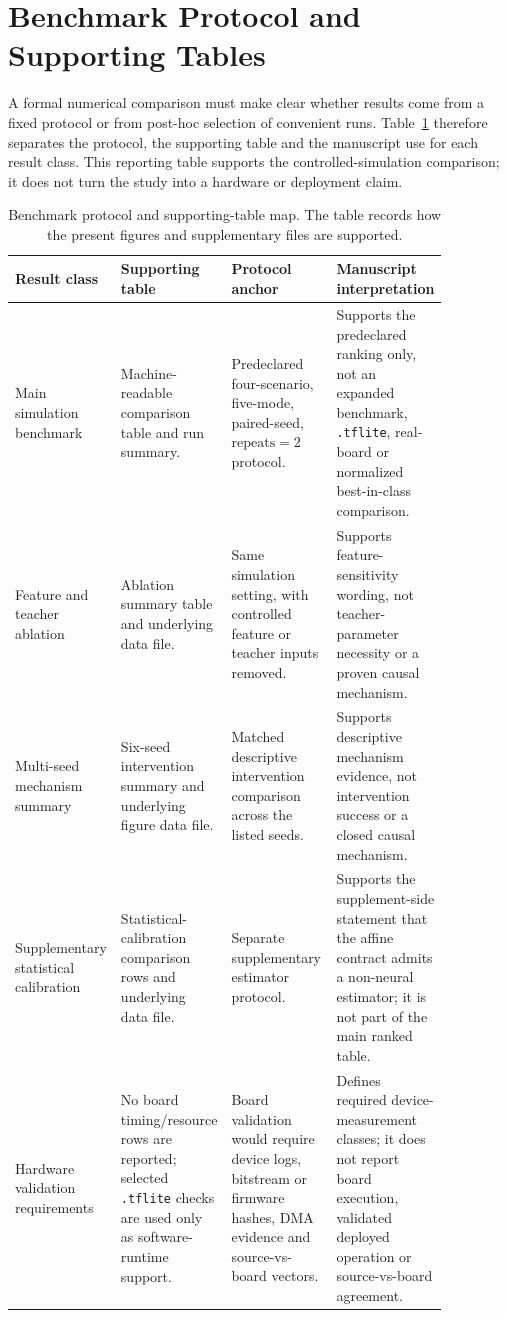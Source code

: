 \documentclass[11pt]{article}
\begin{document}
\section{Benchmark Protocol and Supporting Tables}

A formal numerical comparison must make clear whether results come from a
fixed protocol or from post-hoc selection of convenient runs.
Table~\ref{tab:benchmark-support-map} therefore separates the protocol, the
supporting table and the manuscript use for each result class.  This
reporting table supports the controlled-simulation comparison; it does not turn
the study into a hardware or deployment claim.

\begin{table}[htbp]
\centering
\small
\begin{tabular}{@{}>{\raggedright\arraybackslash}p{0.18\linewidth}>{\raggedright\arraybackslash}p{0.25\linewidth}>{\raggedright\arraybackslash}p{0.25\linewidth}>{\raggedright\arraybackslash}p{0.18\linewidth}@{}}
\toprule
Result class & Supporting table & Protocol anchor & Manuscript interpretation \\
\midrule
Main simulation benchmark &
Machine-readable comparison table and run summary. &
Predeclared four-scenario, five-mode, paired-seed,
\(\mathrm{repeats}=2\) protocol. &
Supports the predeclared ranking only, not an expanded benchmark,
\texttt{.tflite}, real-board or normalized best-in-class comparison. \\
\addlinespace
Feature and teacher ablation &
Ablation summary table and underlying data file. &
Same simulation setting, with controlled feature or teacher inputs removed. &
Supports feature-sensitivity wording, not teacher-parameter necessity or a
proven causal mechanism. \\
\addlinespace
Multi-seed mechanism summary &
Six-seed intervention summary and underlying figure data file. &
Matched descriptive intervention comparison across the listed seeds. &
Supports descriptive mechanism evidence, not intervention success or a closed
causal mechanism. \\
\addlinespace
Supplementary statistical calibration &
Statistical-calibration comparison rows and underlying data file. &
Separate supplementary estimator protocol. &
Supports the supplement-side statement that the affine contract admits a
non-neural estimator; it is not part of the main ranked table. \\
\addlinespace
Hardware validation requirements &
No board timing/resource rows are reported; selected
\texttt{.tflite} checks are used only as software-runtime support. &
Board validation would require device logs, bitstream or firmware hashes,
DMA evidence and source-vs-board vectors. &
Defines required device-measurement classes; it does not report board execution,
validated deployed operation or source-vs-board agreement. \\
\bottomrule
\end{tabular}
\caption{Benchmark protocol and supporting-table map.  The table records how the
present figures and supplementary files are supported.}
\label{tab:benchmark-support-map}
\end{table}
\end{document}
